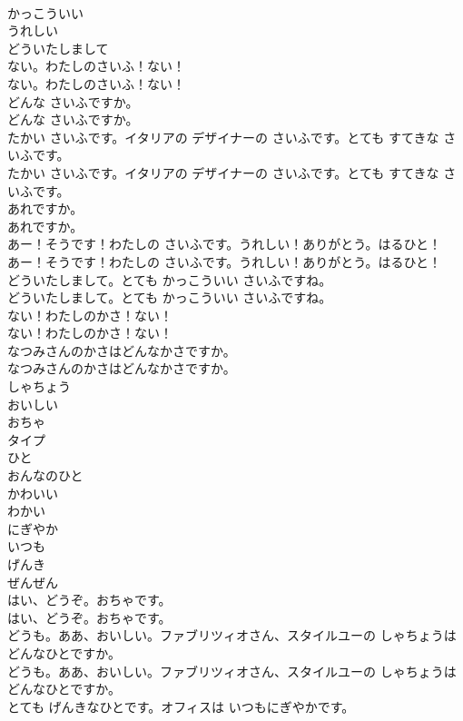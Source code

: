 \documentclass[8pt]{extreport}
\begin{document}
\begin{CJK}{UTF8}{min}
\\	かっこういい
\\	うれしい
\\	どういたしまして
\\	ない。わたしのさいふ！ない！	
\\	ない。わたしのさいふ！ない！ 
\\	どんな さいふですか。	
\\	どんな さいふですか。 
\\	たかい さいふです。イタリアの デザイナーの さいふです。とても すてきな さいふです。	
\\	たかい さいふです。イタリアの デザイナーの さいふです。とても すてきな さいふです。 
\\	あれですか。	
\\	あれですか。 
\\	あー！そうです！わたしの さいふです。うれしい！ありがとう。はるひと！	
\\	あー！そうです！わたしの さいふです。うれしい！ありがとう。はるひと！ 
\\	どういたしまして。とても かっこういい さいふですね。	
\\	どういたしまして。とても かっこういい さいふですね。 
\\	ない！わたしのかさ！ない！	
\\	ない！わたしのかさ！ない！ 
\\	なつみさんのかさはどんなかさですか。	
\\	なつみさんのかさはどんなかさですか。 
\\	しゃちょう
\\	おいしい
\\	おちゃ
\\	タイプ
\\	ひと
\\	おんなのひと
\\	かわいい
\\	わかい
\\	にぎやか
\\	いつも
\\	げんき
\\	ぜんぜん
\\	はい、どうぞ。おちゃです。	
\\	はい、どうぞ。おちゃです。 
\\	どうも。ああ、おいしい。ファブリツィオさん、スタイルユーの しゃちょうは どんなひとですか。	
\\	どうも。ああ、おいしい。ファブリツィオさん、スタイルユーの しゃちょうは どんなひとですか。 
\\	とても げんきなひとです。オフィスは いつもにぎやかです。	

\end{CJK}
\end{document}
